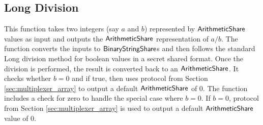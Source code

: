 \subsection{Long Division}
\label{sec:long_division}

This function takes two integers (say $a$ and $b$) represented by ${\mathsf{ArithmeticShare}}$ values as input and outputs the ${\mathsf{ArithmeticShare}}$ representation of $a / b$. The function converts the inputs to ${\mathsf{BinaryStringShare}}$s and then follows the standard Long division method for boolean values in a secret shared format. Once the division is performed, the result is converted back to an ${\mathsf{ArithmeticShare}}$. It checks whether $b = 0$ and if true, then uses protocol from Section \ref{sec:multiplexer_array} to output a default ${\mathsf{ArithmeticShare}}$ of $0$. The function includes a check for zero to handle the special case where $b=0$. If $b = 0$, protocol from Section \ref{sec:multiplexer_array} is used to output a default ${\mathsf{ArithmeticShare}}$ value of $0$.

